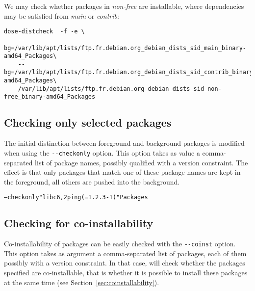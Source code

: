 \begin{example}
We may check whether packages in \textit{non-free} are installable,
where dependencies may be satisfied from \textit{main} or \textit{contrib}:
\begin{verbatim}
dose-distcheck  -f -e \
    --bg=/var/lib/apt/lists/ftp.fr.debian.org_debian_dists_sid_main_binary-amd64_Packages\
    --bg=/var/lib/apt/lists/ftp.fr.debian.org_debian_dists_sid_contrib_binary-amd64_Packages\
    /var/lib/apt/lists/ftp.fr.debian.org_debian_dists_sid_non-free_binary-amd64_Packages
\end{verbatim}
\end{example} 

\subsection{Checking only selected packages}
\label{sec:invocation-background}
The initial distinction between foreground and background packages is
modified when using the \verb|--checkonly| option. This option takes
as value a comma-separated list of package names, possibly qualified
with a version constraint. The effect is that only packages that match
one of these package names are kept in the foreground, all others are
pushed into the background.

\begin{example}
\begin{alltt}
\debcheck{} --checkonly "libc6, 2ping (= 1.2.3-1)" Packages
\end{alltt}
\end{example}

\subsection{Checking for co-installability}
\label{sec:invocation-coinst}
Co-installability of packages can be easily checked with the
\verb|--coinst| option. This option takes as argument a
comma-separated list of packages, each of them possibly with a version
constraint. In that case, \debcheck{} will check whether the packages
specified are co-installable, that is whether it is possible to
install these packages at the same time (see
Section~\ref{sec:coinstallability}).

